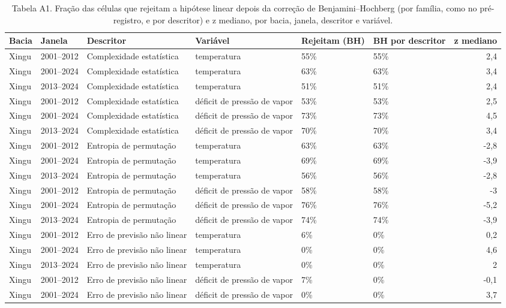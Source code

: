 \begin{table}
\caption{Tabela A1. Fração das células que rejeitam a hipótese linear depois da correção de Benjamini–Hochberg (por família, como no pré-registro, e por descritor) e z mediano, por bacia, janela, descritor e variável.}
\label{tab:07_descritores::rejeicao_bh_janelas}
\begin{tabular}{llllllr}
\toprule
Bacia & Janela & Descritor & Variável & Rejeitam (BH) & BH por descritor & z mediano \\
\midrule
Xingu & 2001–2012 & Complexidade estatística & temperatura & 55\% & 55\% & 2,4 \\
Xingu & 2001–2024 & Complexidade estatística & temperatura & 63\% & 63\% & 3,4 \\
Xingu & 2013–2024 & Complexidade estatística & temperatura & 51\% & 51\% & 2,4 \\
Xingu & 2001–2012 & Complexidade estatística & déficit de pressão de vapor & 53\% & 53\% & 2,5 \\
Xingu & 2001–2024 & Complexidade estatística & déficit de pressão de vapor & 73\% & 73\% & 4,5 \\
Xingu & 2013–2024 & Complexidade estatística & déficit de pressão de vapor & 70\% & 70\% & 3,4 \\
Xingu & 2001–2012 & Entropia de permutação & temperatura & 63\% & 63\% & -2,8 \\
Xingu & 2001–2024 & Entropia de permutação & temperatura & 69\% & 69\% & -3,9 \\
Xingu & 2013–2024 & Entropia de permutação & temperatura & 56\% & 56\% & -2,8 \\
Xingu & 2001–2012 & Entropia de permutação & déficit de pressão de vapor & 58\% & 58\% & -3 \\
Xingu & 2001–2024 & Entropia de permutação & déficit de pressão de vapor & 76\% & 76\% & -5,2 \\
Xingu & 2013–2024 & Entropia de permutação & déficit de pressão de vapor & 74\% & 74\% & -3,9 \\
Xingu & 2001–2012 & Erro de previsão não linear & temperatura & 6\% & 0\% & 0,2 \\
Xingu & 2001–2024 & Erro de previsão não linear & temperatura & 0\% & 0\% & 4,6 \\
Xingu & 2013–2024 & Erro de previsão não linear & temperatura & 0\% & 0\% & 2 \\
Xingu & 2001–2012 & Erro de previsão não linear & déficit de pressão de vapor & 7\% & 0\% & -0,1 \\
Xingu & 2001–2024 & Erro de previsão não linear & déficit de pressão de vapor & 0\% & 0\% & 3,7 \\

\end{tabular}
\end{table}
